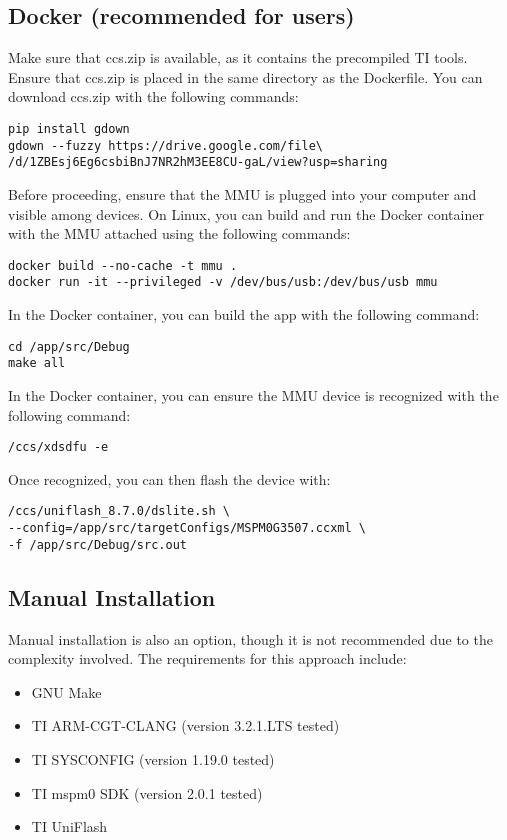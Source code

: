 \subsection{Docker (recommended for users)}
Make sure that ccs.zip is available, as it contains the precompiled TI tools. Ensure that ccs.zip is placed in the same directory as the Dockerfile. You can download ccs.zip with the following commands:
    \begin{verbatim}
pip install gdown
gdown --fuzzy https://drive.google.com/file\
/d/1ZBEsj6Eg6csbiBnJ7NR2hM3EE8CU-gaL/view?usp=sharing
    \end{verbatim}
Before proceeding, ensure that the MMU is plugged into your computer and visible among devices. On Linux, you can build and run the Docker container with the MMU attached using the following commands:
    \begin{verbatim}
docker build --no-cache -t mmu .
docker run -it --privileged -v /dev/bus/usb:/dev/bus/usb mmu
    \end{verbatim}
In the Docker container, you can build the app with the following command:
    \begin{verbatim}
cd /app/src/Debug
make all
    \end{verbatim}
In the Docker container, you can ensure the MMU device is recognized with the following command:
    \begin{verbatim}
/ccs/xdsdfu -e
    \end{verbatim}
Once recognized, you can then flash the device with:
    \begin{verbatim}
/ccs/uniflash_8.7.0/dslite.sh \
--config=/app/src/targetConfigs/MSPM0G3507.ccxml \
-f /app/src/Debug/src.out
    \end{verbatim}

\subsection{Manual Installation}
Manual installation is also an option, though it is not recommended due to the complexity involved. The requirements for this approach include:
\begin{itemize}
    \item GNU Make \cite{make}
    \item TI ARM-CGT-CLANG (version 3.2.1.LTS tested) \cite{compiler}
    \item TI SYSCONFIG (version 1.19.0 tested) \cite{sysconfig}
    \item TI mspm0 SDK (version 2.0.1 tested) \cite{sdk}
    \item TI UniFlash \cite{uniflash}
\end{itemize}

